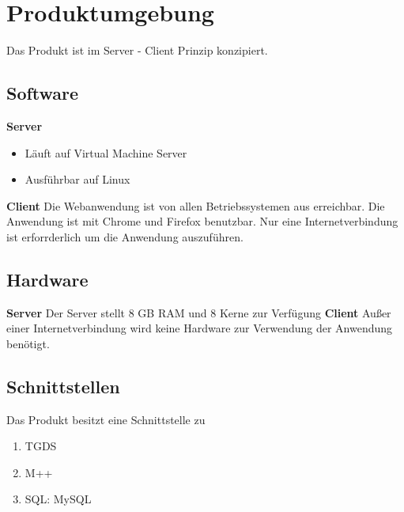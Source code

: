 \chapter{Produktumgebung}
Das Produkt ist im Server - Client Prinzip konzipiert.

\section{Software}
\textbf{Server}
\begin{itemize}
    \item Läuft auf Virtual Machine Server
    \item Ausführbar auf Linux
\end{itemize}
\textbf{Client} Die Webanwendung ist von allen Betriebssystemen aus erreichbar. Die Anwendung ist mit Chrome und Firefox benutzbar. Nur eine Internetverbindung ist erforrderlich um die Anwendung auszuführen.
\section{Hardware}
\textbf{Server}
Der Server stellt 8 GB RAM und 8 Kerne zur Verfügung
\textbf{Client}
Außer einer Internetverbindung wird keine Hardware zur Verwendung der Anwendung benötigt.
\newpage
\section{Schnittstellen}
\renewcommand{\labelenumi}{/S\arabic{enumi}0/}
Das Produkt besitzt eine Schnittstelle zu
\begin{enumerate}
    \setlength\itemsep{-1em}
    \item TGDS
    \item M++
    \item SQL: MySQL
\end{enumerate}
